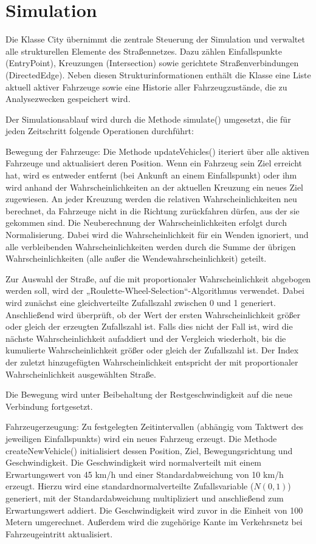 \clearpage

\section{Simulation}

Die Klasse City übernimmt die zentrale Steuerung der Simulation und verwaltet alle strukturellen Elemente des Straßennetzes.
Dazu zählen Einfallspunkte (EntryPoint), Kreuzungen (Intersection) sowie gerichtete Straßenverbindungen (DirectedEdge).
Neben diesen Strukturinformationen enthält die Klasse eine Liste aktuell aktiver Fahrzeuge sowie eine Historie aller Fahrzeugzustände,
die zu Analysezwecken gespeichert wird.

Der Simulationsablauf wird durch die Methode simulate() umgesetzt,
die für jeden Zeitschritt folgende Operationen durchführt:

Bewegung der Fahrzeuge: Die Methode updateVehicles() iteriert über alle aktiven Fahrzeuge und aktualisiert deren Position.
Wenn ein Fahrzeug sein Ziel erreicht hat,
wird es entweder entfernt (bei Ankunft an einem Einfallspunkt) oder ihm wird anhand der Wahrscheinlichkeiten an der aktuellen Kreuzung ein neues Ziel zugewiesen.
An jeder Kreuzung werden die relativen Wahrscheinlichkeiten neu berechnet, da Fahrzeuge nicht in die Richtung zurückfahren dürfen, aus der sie gekommen sind.
Die Neuberechnung der Wahrscheinlichkeiten erfolgt durch Normalisierung. Dabei wird die Wahrscheinlichkeit für ein Wenden ignoriert,
und alle verbleibenden Wahrscheinlichkeiten werden durch die Summe der übrigen Wahrscheinlichkeiten (alle außer die Wendewahrscheinlichkeit) geteilt.

Zur Auswahl der Straße, auf die mit proportionaler Wahrscheinlichkeit abgebogen werden soll, wird der „Roulette-Wheel-Selection“-Algorithmus verwendet. 
Dabei wird zunächst eine gleichverteilte Zufallszahl zwischen 0 und 1 generiert. Anschließend wird überprüft, ob der Wert der ersten Wahrscheinlichkeit größer oder gleich der erzeugten Zufallszahl ist. 
Falls dies nicht der Fall ist, wird die nächste Wahrscheinlichkeit aufaddiert und der Vergleich wiederholt, bis die kumulierte Wahrscheinlichkeit größer oder gleich der Zufallszahl ist. 
Der Index der zuletzt hinzugefügten Wahrscheinlichkeit entspricht der mit proportionaler Wahrscheinlichkeit ausgewählten Straße.

Die Bewegung wird unter Beibehaltung der Restgeschwindigkeit auf die neue Verbindung fortgesetzt.

Fahrzeugerzeugung: Zu festgelegten Zeitintervallen (abhängig vom Taktwert des jeweiligen Einfallspunkts) wird ein neues Fahrzeug erzeugt.
Die Methode createNewVehicle() initialisiert dessen Position, Ziel, Bewegungsrichtung und Geschwindigkeit.
Die Geschwindigkeit wird normalverteilt mit einem Erwartungswert von 45 km/h und einer Standardabweichung von 10 km/h erzeugt.
Hierzu wird eine standardnormalverteilte Zufallsvariable (\(N(0,1)\)) generiert, mit der Standardabweichung multipliziert und anschließend zum Erwartungswert addiert.
Die Geschwindigkeit wird zuvor in die Einheit von 100 Metern umgerechnet.
Außerdem wird die zugehörige Kante im Verkehrsnetz bei Fahrzeugeintritt aktualisiert.

